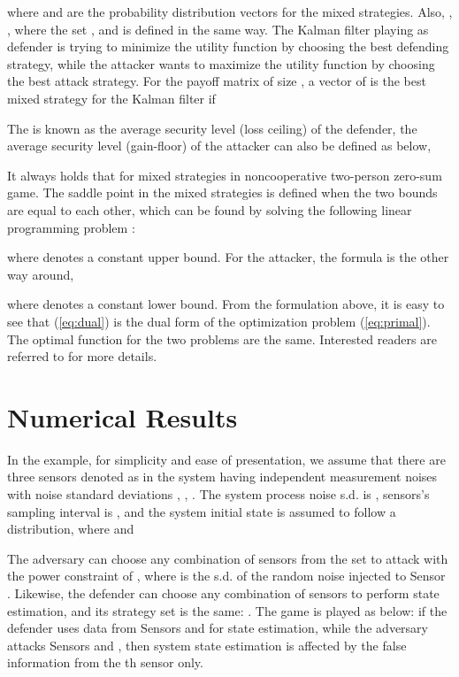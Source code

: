 \documentclass{article}
\begin{document}
where  and  are the probability distribution vectors for the mixed strategies. Also, , , where the set , and   is defined in the same way. The Kalman filter playing as defender is trying to minimize the utility function  by choosing the best defending strategy, while the attacker wants to maximize the utility function  by choosing the best attack strategy. 
For the payoff matrix  of size , a vector of  is the best mixed strategy for the Kalman filter if 

The  is known as the average security level (loss ceiling) of the defender, the average security level (gain-floor) of the attacker  can also be defined as below,


It always holds that  for mixed strategies in noncooperative two-person zero-sum game. The saddle point in the mixed strategies is defined when the two bounds are equal to each other, which  can be found by solving the following  linear programming problem \cite{basar&olsder:book}:

where  denotes a constant upper bound. For the attacker, the formula is the other way around,

where  denotes a constant lower bound. From the formulation above, it is easy to see that (\ref{eq:dual}) is the dual form of the optimization problem (\ref{eq:primal}). The optimal function for the two problems are the same. Interested readers are referred to \cite{basar&olsder:book} for more details.

\section{Numerical Results}
\label{sec:numerical}
In the example, for simplicity and ease of presentation, we assume that  there are three  sensors denoted as  in the system having  independent measurement noises with   noise standard deviations    , , . The system process noise s.d. is  , sensors's sampling interval is , and the system initial state  is assumed to follow a  distribution, where  and  
 
 
  The adversary  can choose any combination of sensors from the set   to attack with the power constraint of , where   is the s.d. of the random noise injected to Sensor .  Likewise,   the defender can choose any combination of sensors to perform  state estimation, and its  strategy set is the same: . The game is played as below: if the defender uses data from Sensors  and  for state estimation, while the adversary attacks Sensors  and , then  system state estimation is affected by the false information from the th sensor only. 
 
\end{document}
